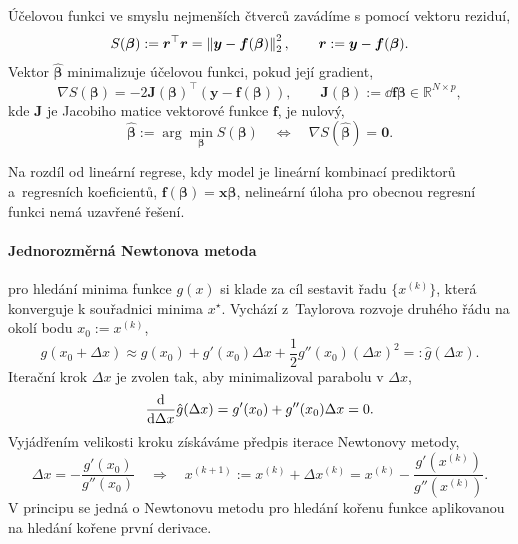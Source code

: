 Účelovou funkci ve smyslu nejmenších čtverců zavádíme s pomocí vektoru reziduí,
\begin{equation}
    S(\bm{\beta}):=\bm{r}^\top\bm{r}=\left\lVert\bm{y}-\bm{f}(\bm{\beta})\right\rVert_2^2,\qquad \bm{r}:=\bm{y}-\bm{f}(\bm{\beta}).
\end{equation}
Vektor $\hat{\bm{\beta}}$ minimalizuje účelovou funkci, pokud její gradient,
\begin{equation}
    \nabla S (\bm{\beta})=-2\mathbf{J}(\bm{\beta})^\top(\bm{y}-\bm{f}(\bm{\beta})),\qquad \mathbf{J}(\bm{\beta}):=\dd{\bm{f}}{\bm{\beta}}\in\mathbb{R}^{N\times p},
\end{equation}
kde $\mathbf{J}$ je Jacobiho matice vektorové funkce $\bm{f}$, je nulový,
\begin{equation}
    \hat{\bm{\beta}}:=\arg \min_{\bm{\beta}} S(\bm{\beta})
    \quad\Longleftrightarrow\quad 
    \nabla S (\hat{\bm{\beta}})=\bm{0}.
\end{equation}

Na rozdíl od lineární regrese, kdy model je lineární kombinací prediktorů a~regresních koeficientů, $\bm{f}(\bm{\beta})=\bm{x}\bm{\beta}$, nelineární úloha pro obecnou regresní funkci nemá uzavřené řešení.

\paragraph{Jednorozměrná Newtonova metoda} pro hledání minima funkce $g(x)$ si klade za cíl sestavit řadu $\{x^{(k)}\}$, která konverguje k souřadnici minima $x^\star$. Vychází z~Taylorova rozvoje druhého řádu na okolí bodu $x_0:=x^{(k)}$,
\begin{equation}
    g(x_0+\Delta x)\approx g(x_0)+g'(x_0)\Delta x+\frac{1}{2}g''(x_0)(\Delta x)^2=:\hat{g}(\Delta x).
\end{equation}
Iterační krok $\Delta x$ je zvolen tak, aby minimalizoval parabolu v $\Delta x$,
\begin{equation}
    \frac{\mathrm{d} }{\mathrm{d} \Delta x}\hat{g}(\Delta x)=g'(x_0)+g''(x_0)\Delta x=0.
\end{equation}
Vyjádřením velikosti kroku získáváme předpis iterace Newtonovy metody,
\begin{equation}
    \Delta x=-\frac{g'(x_0)}{g''(x_0)}\quad \Longrightarrow \quad x^{(k+1)}:=x^{(k)}+\Delta x^{(k)}=x^{(k)}-\frac{g'(x^{(k)})}{g''(x^{(k)})}.
\end{equation}
V principu se jedná o Newtonovu metodu pro hledání kořenu funkce aplikovanou na hledání kořene první derivace.

